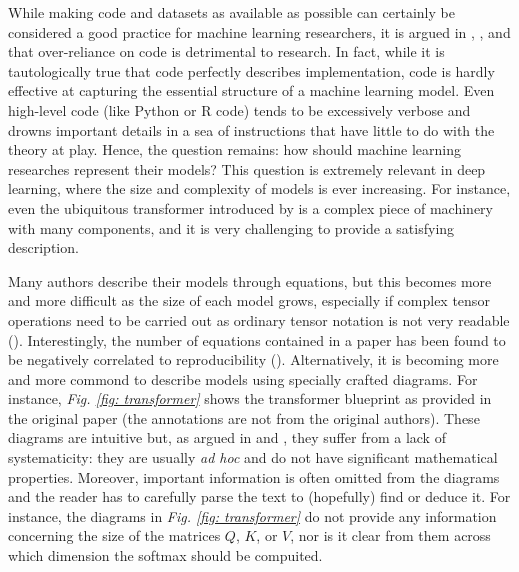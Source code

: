 \documentclass[11pt,a4paper,openright,twoside]{report}
\theoremstyle{plain}
\theoremstyle{definition}
\begin{document}
While making code and datasets as available as possible can certainly be considered a good practice for machine learning researchers, it is argued in \cite{abbott2024neural}, \cite{khatri2024anatomy}, and \cite{phuong2022formal} that over-reliance on code is detrimental to research. In fact, while it is tautologically true that code perfectly describes implementation, code is hardly effective at capturing the essential structure of a machine learning model. Even high-level code (like Python or R code) tends to be excessively verbose and drowns important details in a sea of instructions that have little to do with the theory at play. Hence, the question remains: how should machine learning researches represent their models? This question is extremely relevant in deep learning, where the size and complexity of models is ever increasing. For instance, even the ubiquitous transformer introduced by \cite{vaswani2017attention} is a complex piece of machinery with many components, and it is very challenging to provide a satisfying description.

Many authors describe their models through equations, but this becomes more and more difficult as the size of each model grows, especially if complex tensor operations need to be carried out as ordinary tensor notation is not very readable (\cite{xu2023graph}). Interestingly, the number of equations contained in a paper has been found to be negatively correlated to reproducibility (\cite{raff2019step}). Alternatively, it is becoming more and more commond to describe models using specially crafted diagrams. For instance, \textit{Fig. \ref{fig: transformer}} shows the transformer blueprint as provided in the original paper \cite{vaswani2017attention} (the annotations are not from the original authors). These diagrams are intuitive but, as argued in \cite{abbott2024neural} and \cite{khatri2024anatomy}, they suffer from a lack of systematicity: they are usually \textit{ad hoc} and do not have significant mathematical properties.
Moreover, important information is often omitted from the diagrams and the reader has to carefully parse the text to (hopefully) find or deduce it. For instance, the diagrams in \textit{Fig. \ref{fig: transformer}} do not provide any information concerning the size of the matrices $Q$, $K$, or $V$, nor is it clear from them across which dimension the softmax should be compuited.
\end{document}
